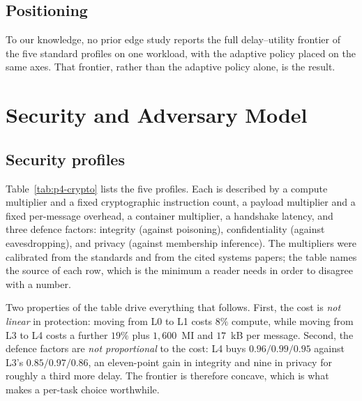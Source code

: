 \documentclass[journal,10pt]{IEEEtran}
\begin{document}
\subsection{Positioning}
To our knowledge, no prior edge study reports the full delay--utility frontier
of the five standard profiles on one workload, with the adaptive policy placed
on the same axes. That frontier, rather than the adaptive policy alone, is the
result.

\section{Security and Adversary Model}
\label{sec:model}

\subsection{Security profiles}
Table~\ref{tab:p4-crypto} lists the five profiles. Each is described by a
compute multiplier and a fixed cryptographic instruction count, a payload
multiplier and a fixed per-message overhead, a container multiplier, a
handshake latency, and three defence factors: integrity (against poisoning),
confidentiality (against eavesdropping), and privacy (against
membership inference). The multipliers were calibrated from the standards and
from the cited systems papers; the table names the source of each row, which is
the minimum a reader needs in order to disagree with a number.



Two properties of the table drive everything that follows. First, the cost is
\emph{not linear} in protection: moving from L0 to L1 costs $8\%$ compute, while
moving from L3 to L4 costs a further $19\%$ plus $1{,}600$~MI and $17$~kB per
message. Second, the defence factors are \emph{not proportional} to the cost:
L4 buys $0.96/0.99/0.95$ against L3's $0.85/0.97/0.86$, an eleven-point gain in
integrity and nine in privacy for roughly a third more delay. The frontier is
therefore concave, which is what makes a per-task choice worthwhile.
\end{document}
